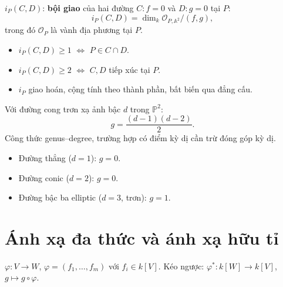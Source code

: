 \documentclass[12pt,a4paper]{article}
\begin{document}
\begin{dinhnghia}[title={Bội giao (intersection multiplicity)}]
  $i_P(C, D)$: \textbf{bội giao} của hai đường $C: f = 0$ và $D: g = 0$ tại $P$:
  \[
    i_P(C, D) = \dim_k \mathcal{O}_{P,\mathbb{A}^2} / (f, g),
  \]
  trong đó $\mathcal{O}_{P}$ là vành địa phương tại $P$.
\end{dinhnghia}

\begin{tinhchat}[title={Tính chất bội giao}]
  \begin{itemize}
    \item $i_P(C, D) \ge 1$ $\Leftrightarrow$ $P \in C \cap D$.
    \item $i_P(C, D) \ge 2$ $\Leftrightarrow$ $C, D$ tiếp xúc tại $P$.
    \item $i_P$ giao hoán, cộng tính theo thành phần, bất biến qua đẳng cấu.
  \end{itemize}
\end{tinhchat}

\begin{dinhnghia}[title={Giống (genus)}]
  Với đường cong trơn xạ ảnh bậc $d$ trong $\mathbb{P}^2$:
  \[
    g = \frac{(d-1)(d-2)}{2}.
  \]
  Công thức genus--degree, trường hợp có điểm kỳ dị cần trừ đóng góp kỳ dị.
\end{dinhnghia}

\begin{vidu}
  \begin{itemize}
    \item Đường thẳng ($d = 1$): $g = 0$.
    \item Đường conic ($d = 2$): $g = 0$.
    \item Đường bậc ba elliptic ($d = 3$, trơn): $g = 1$.
  \end{itemize}
\end{vidu}

\section{Ánh xạ đa thức và ánh xạ hữu tỉ}

\begin{dinhnghia}[title={Ánh xạ đa thức (morphism)}]
  $\varphi: V \to W$, $\varphi = (f_1, \ldots, f_m)$ với $f_i \in k[V]$. Kéo ngược: $\varphi^*: k[W] \to k[V]$, $g \mapsto g \circ \varphi$.
\end{dinhnghia}
\end{document}

